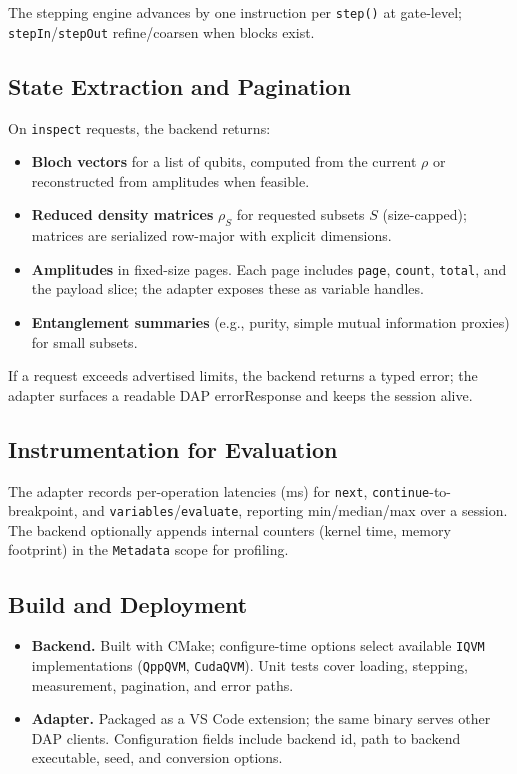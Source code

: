 \documentclass[12pt]{article}
\begin{document}
\begin{itemize}
The stepping engine advances by one instruction per \texttt{step()} at gate-level; \texttt{stepIn}/\texttt{stepOut} refine/coarsen when blocks exist.

\subsection{State Extraction and Pagination}

On \texttt{inspect} requests, the backend returns:

\begin{itemize}
  \item \textbf{Bloch vectors} for a list of qubits, computed from the current \(\rho\) or reconstructed from amplitudes when feasible.
  \item \textbf{Reduced density matrices} \(\rho_S\) for requested subsets \(S\) (size-capped); matrices are serialized row-major with explicit dimensions.
  \item \textbf{Amplitudes} in fixed-size pages. Each page includes \texttt{page}, \texttt{count}, \texttt{total}, and the payload slice; the adapter exposes these as variable handles.
  \item \textbf{Entanglement summaries} (e.g., purity, simple mutual information proxies) for small subsets.
\end{itemize}

If a request exceeds advertised limits, the backend returns a typed error; the adapter surfaces a readable DAP errorResponse and keeps the session alive.



\subsection{Instrumentation for Evaluation}

The adapter records per-operation latencies (ms) for \texttt{next}, \texttt{continue}-to-breakpoint, and \texttt{variables}/\texttt{evaluate}, reporting min/median/max over a session. The backend optionally appends internal counters (kernel time, memory footprint) in the \texttt{Metadata} scope for profiling.

\subsection{Build and Deployment}

\begin{itemize}
  \item \textbf{Backend.} Built with CMake; configure-time options select available \texttt{IQVM} implementations (\texttt{QppQVM}, \texttt{CudaQVM}). Unit tests cover loading, stepping, measurement, pagination, and error paths.
  \item \textbf{Adapter.} Packaged as a VS Code extension; the same binary serves other DAP clients. Configuration fields include backend id, path to backend executable, seed, and conversion options.
\end{itemize}


\end{itemize}
\end{document}
